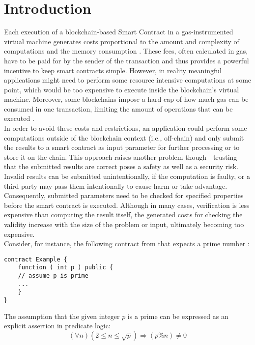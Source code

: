 \chapter{Introduction}\label{chap:introduction}
Each execution of a blockchain-based Smart Contract in a gas-instrumented virtual machine generates costs proportional to the amount and complexity of computations and the  memory consumption \cite{goodman_tezos_2014}\cite{wood_ethereum_2021}. These fees, often calculated in gas, have to be paid for by the sender of the transaction and thus provides a powerful incentive to keep  smart contracts simple. However, in reality meaningful applications might need to perform some resource intensive computations at some point, which would be too expensive to execute inside the blockchain's virtual machine. Moreover, some blockchains impose a hard cap of how much gas can be consumed in one transaction, limiting the amount of operations that can be executed \cite{goodman_tezos_2014}.\\
In order to avoid these costs and restrictions, an application could perform some computations outside of the blockchain context (i.e., off-chain) and only submit the results to a smart contract as input parameter for further processing or to store it on the chain. This approach raises another problem though - trusting that the submitted results are correct poses a safety as well as a security risk. Invalid results can be submitted unintentionally, if the computation is faulty, or a third party may pass them intentionally to cause harm or take advantage. Consequently, submitted parameters need to be checked for specified properties before the smart contract is executed. Although in many cases, verification is less expensive than computing the result itself, the generated costs for checking the validity increase with the size of the problem or input, ultimately becoming too expensive. \\
Consider, for instance, the following contract from \cite{thiemann_2020} that expects a prime number :
\begin{lstlisting}[caption=Smart contract expecting a prime number, numbers=none, language=Solidity]
contract Example {
	function ( int p ) public {
	// assume p is prime
	...
	}
}
\end{lstlisting}

The assumption that the given integer $p$ is a prime can be expressed as an explicit assertion in predicate logic: 
\begin{equation}\label{eq:prime}
    (\forall n) (2 \le n \le \sqrt{p}) \Rightarrow (p \% n) \neq 0
\end{equation}


